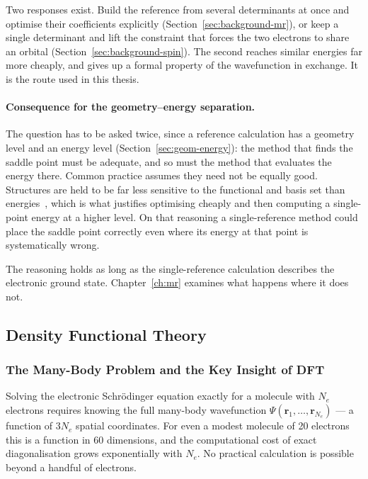 Two responses exist. Build the reference from several determinants at once and
optimise their coefficients explicitly (Section~\ref{sec:background-mr}), or keep
a single determinant and lift the constraint that forces the two electrons to
share an orbital (Section~\ref{sec:background-spin}). The second reaches similar
energies far more cheaply, and gives up a formal property of the wavefunction in
exchange. It is the route used in this thesis.

\paragraph{Consequence for the geometry--energy separation.}
The question has to be asked twice, since a reference calculation has a geometry
level and an energy level (Section~\ref{sec:geom-energy}): the method that finds
the saddle point must be adequate, and so must the method that evaluates the
energy there. Common practice assumes they need not be equally good. Structures
are held to be far less sensitive to the functional and basis set than
energies~\cite{bursch2022}, which is what justifies optimising cheaply and then
computing a single-point energy at a higher level. On that reasoning a
single-reference method could place the saddle point correctly even where its
energy at that point is systematically wrong.

The reasoning holds as long as the single-reference calculation describes the
electronic ground state. Chapter~\ref{ch:mr} examines what happens where it does
not.

\subsection{Density Functional Theory}
\label{sec:background-dft}

\subsubsection{The Many-Body Problem and the Key Insight of DFT}

Solving the electronic Schrödinger equation exactly for a molecule with $N_e$
electrons requires knowing the full many-body wavefunction
$\Psi(\mathbf{r}_1, \ldots, \mathbf{r}_{N_e})$ --- a function of $3N_e$ spatial
coordinates. For even a modest molecule of 20 electrons this is a function in 60
dimensions, and the computational cost of exact diagonalisation grows
exponentially with $N_e$. No practical calculation is possible beyond a handful
of electrons.


